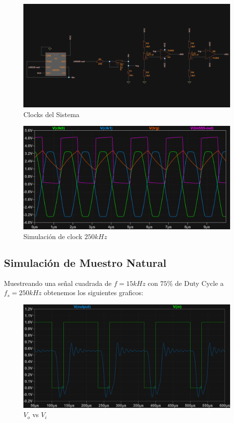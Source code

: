 \begin{figure}[H]
    \centering
    \includegraphics[width=0.8\linewidth]{Imagenes Nacho/OsciladorEsquema.png}
    \caption{Clocks del Sistema}
    \label{fig:OsciladorEsquema}
\end{figure}

\begin{figure}[H]
    \centering
    \includegraphics[width=0.8\linewidth]{Imagenes Nacho/Oscilador.png}
    \caption{Simulaci\'on de clock $250kHz$}
    \label{fig:Oscilador}
\end{figure}

\subsection{Simulaci\'on de Muestro Natural}
Muestreando una señal cuadrada de $f = 15kHz$ con $75\%$ de Duty Cycle a $f_s = 250kHz$ obtenemos los siguientes graficos:

\begin{figure}[H]
    \centering
    \includegraphics[width=0.8\linewidth]{Imagenes Nacho/Natural/Natural-Vi-Sqr15k.png}
    \caption{$V_o$ vs $V_i$}
    \label{fig:Natural-Vi-Sqr15k}
\end{figure}

